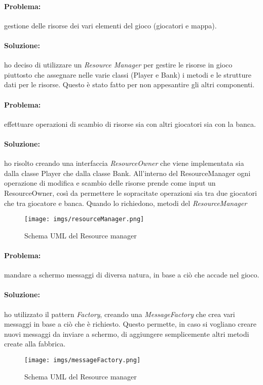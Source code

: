 \documentclass[a4paper,12pt]{report}
\begin{document}
\paragraph{Problema:} gestione delle risorse dei vari elementi del gioco (giocatori e mappa).
\paragraph{Soluzione:} ho deciso di utilizzare un \textit{Resource Manager} per gestire le risorse in gioco piuttosto che assegnare nelle varie classi (Player e Bank) i metodi e le strutture dati per le risorse. Questo \`e stato fatto per non appesantire gli altri componenti.
\paragraph{Problema:}effettuare operazioni di scambio di risorse sia con altri giocatori sia con la banca.

\paragraph{Soluzione:}ho risolto creando una interfaccia \textit{ResourceOwner} che viene implementata sia dalla classe Player che dalla classe Bank. All'interno del ResourceManager  ogni operazione di modifica e scambio delle risorse prende come input un ResourceOwner, cos\`i da permettere le sopracitate operazioni sia tra due giocatori che tra giocatore e banca. Quando lo richiedono, metodi del \textit{ResourceManager}     
\begin{figure}[H]
\centering{}
\texttt{[image: imgs/resourceManager.png]}
\caption{Schema UML del Resource manager}
\label{img:analysis}
\end{figure}
\paragraph{Problema:} mandare a schermo messaggi di diversa natura, in base a ci\`o che accade nel gioco.
\paragraph{Soluzione:} ho utilizzato il pattern \textit{Factory}, creando una \textit{MessageFactory} che crea vari messaggi in base a ci\`o che \`e richiesto. Questo permette, in caso si vogliano creare nuovi messaggi da inviare a schermo, di aggiungere semplicemente altri metodi create alla fabbrica.
\begin{figure}[H]
\centering{}
\texttt{[image: imgs/messageFactory.png]}
\caption{Schema UML del Resource manager}
\label{img:analysis}
\end{figure}
\end{document}
